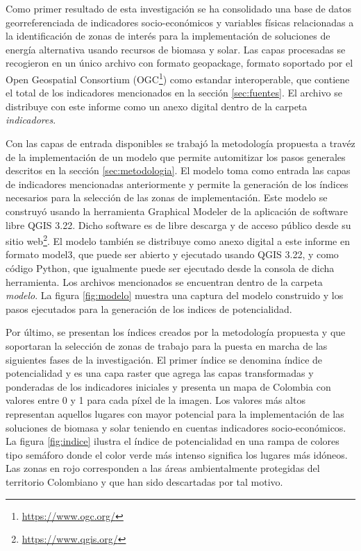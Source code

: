 
Como primer resultado de esta investigación se ha consolidado una base de datos georreferenciada de indicadores socio-económicos y variables físicas relacionadas a la identificación
de zonas de interés para la implementación de soluciones de energía alternativa usando recursos de biomasa y solar.  Las capas procesadas se recogieron en un
único archivo con formato geopackage, formato soportado por el Open Geospatial Consortium (OGC\footnote{\url{https://www.ogc.org/}}) como estandar 
interoperable, que contiene el total de los indicadores mencionados en la sección \ref{sec:fuentes}.  El archivo se distribuye con este informe como un 
anexo digital dentro de la carpeta \textit{indicadores}.

Con las capas de entrada disponibles se trabajó la metodología propuesta a travéz de la implementación de un modelo que permite automitizar los pasos 
generales descritos en la sección \ref{sec:metodologia}.  El modelo toma como entrada las capas de indicadores mencionadas anteriormente y permite la 
generación de los índices necesarios para la selección de las zonas de implementación.  Este modelo se construyó usando la herramienta Graphical Modeler de la 
aplicación de software libre QGIS 3.22.  Dicho software es de libre descarga y de acceso público desde su sitio web\footnote{\url{https://www.qgis.org/}}.  El 
modelo también se distribuye como anexo digital a este informe en formato model3, que puede ser abierto y ejecutado usando QGIS 3.22, y como código Python, que 
igualmente puede ser ejecutado desde la consola de dicha herramienta.  Los archivos mencionados se encuentran dentro de la carpeta \textit{modelo}.  La figura 
\ref{fig:modelo} muestra una captura del modelo construido y los pasos ejecutados para la generación de los indices de potencialidad.

Por último, se presentan los índices creados por la metodología propuesta y que soportaran la selección de zonas de trabajo para la puesta en marcha de las 
siguientes fases de la investigación.  El primer índice se denomina índice de potencialidad y es una capa raster que agrega las capas transformadas y 
ponderadas de los indicadores iniciales y presenta un mapa de Colombia con valores entre 0 y 1 para cada píxel de la imagen.  Los valores más altos representan 
aquellos lugares con mayor potencial para la implementación de las soluciones de biomasa y solar teniendo en cuentas indicadores socio-económicos. 
 La figura \ref{fig:indice} ilustra el índice de potencialidad en una rampa de colores tipo semáforo donde el color verde más intenso significa los lugares más 
idóneos.  Las zonas en rojo corresponden a las áreas ambientalmente protegidas del territorio Colombiano y que han sido descartadas por tal motivo.

